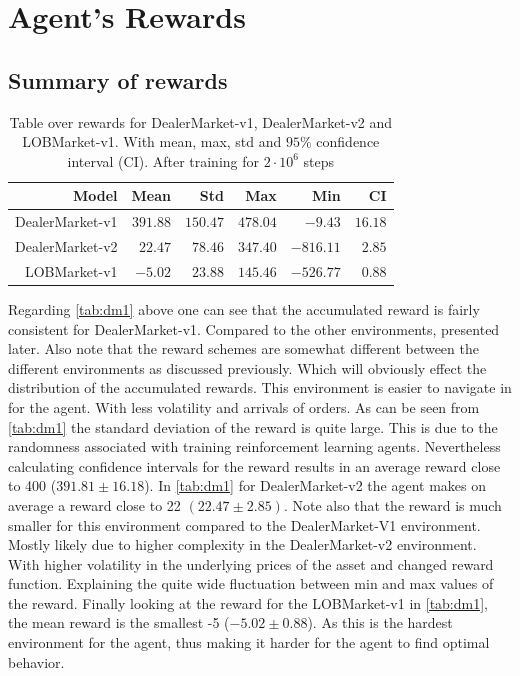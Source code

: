 \documentclass{kththesis}
\theoremstyle{definition}
\begin{document}
\newpage
\section{Agent's Rewards}

\subsection*{Summary of rewards}
\begin{table}[H]
\centering
\caption{Table over rewards for DealerMarket-v1, DealerMarket-v2 and LOBMarket-v1. With mean, max, std and $95\%$ confidence interval (CI). After training for $2\cdot10^6$ steps}
\label{tab:dm1}
\begin{tabular}{rrrrrr}
  \hline
 \textbf{Model} & \textbf{Mean} & \textbf{Std} & \textbf{Max} & \textbf{Min} & \textbf{CI} \\ 
  \hline
DealerMarket-v1 & $391.88$ & $150.47$ & $478.04$ & $-9.43$ & $16.18$ \\
DealerMarket-v2 & $22.47$ & $78.46$ & $347.40$ & $-816.11$ & $2.85$  \\
LOBMarket-v1& $-5.02$ & $23.88$ & $145.46$ & $-526.77$ & $0.88$ \\ 

   \hline
\end{tabular}
\end{table}
Regarding \autoref{tab:dm1} above one can see that the accumulated reward is fairly consistent for DealerMarket-v1. Compared to the other environments, presented later. Also note that the reward schemes are somewhat different between the different environments as discussed previously. Which will obviously effect the distribution of the accumulated rewards. This environment is easier to navigate in for the agent. With less volatility and arrivals of orders. 
\newline
\newline
As can be seen from \autoref{tab:dm1} the standard deviation of the reward is quite large. This is due to the randomness associated with training reinforcement learning agents. Nevertheless calculating confidence intervals for the reward results in an average reward close to 400 ($391.81 \pm 16.18$). In \autoref{tab:dm1} for DealerMarket-v2 the agent makes on average a reward close to 22 $(22.47 \pm 2.85)$.
\newline
\newline
Note also that the reward is much smaller for this environment compared to the DealerMarket-V1 environment. Mostly likely due to higher complexity in the DealerMarket-v2 environment. With higher volatility in the underlying prices of the asset and changed reward function. Explaining the quite wide fluctuation between min and max values of the reward. Finally looking at the reward for the LOBMarket-v1 in \autoref{tab:dm1},  the mean reward is the smallest -5 ($-5.02 \pm 0.88$). As this is the hardest environment for the agent, thus making it harder for the agent to find optimal behavior.
\end{document}
